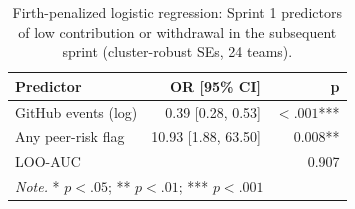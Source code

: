 \begin{table}[ht]
\centering
\scriptsize
\setlength{\tabcolsep}{4pt}
\renewcommand{\arraystretch}{0.88}
\caption{Firth-penalized logistic regression: Sprint 1 predictors of low contribution or withdrawal in the subsequent sprint (cluster-robust SEs, 24 teams).}
\label{tab:firth_s1s2}
\begin{tabular}{l r r}
\toprule
\textbf{Predictor} & \textbf{OR [95\% CI]} & \textbf{p} \\
\midrule
GitHub events (log) & 0.39 [0.28, 0.53] & $< .001$*** \\
Any peer-risk flag & 10.93 [1.88, 63.50] & 0.008** \\
\midrule
LOO-AUC & \multicolumn{2}{r}{0.907} \\
\midrule
\multicolumn{3}{l}{\textit{Note.} * $p < .05$; ** $p < .01$; *** $p < .001$} \\
\bottomrule
\end{tabular}
\end{table}
